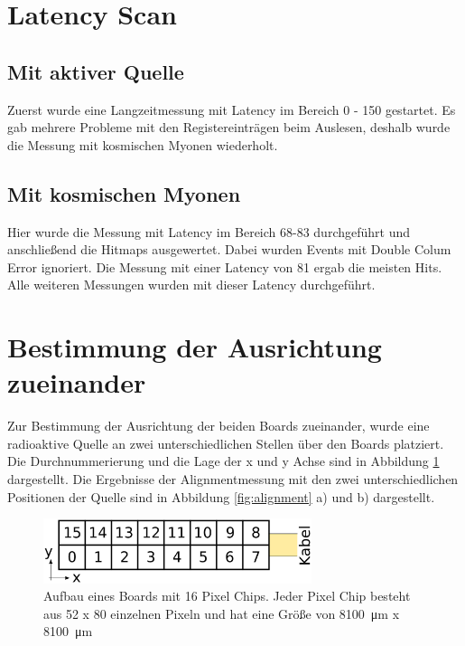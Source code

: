 \documentclass[usenames,dvipsnames]{include/protokollclass}
\begin{document}
	\section{Latency Scan}
	\subsection{Mit aktiver Quelle}
	Zuerst wurde eine Langzeitmessung mit Latency im Bereich 0 - 150 gestartet. 
	Es gab mehrere Probleme mit den Registereinträgen beim Auslesen, deshalb wurde die Messung mit kosmischen Myonen wiederholt. 
	\subsection{Mit kosmischen Myonen}
	Hier wurde die Messung mit Latency im Bereich 68-83 durchgeführt und anschließend die Hitmaps ausgewertet. Dabei wurden Events mit Double Colum Error ignoriert. Die Messung mit einer Latency von 81 ergab die meisten Hits. Alle weiteren Messungen wurden mit dieser Latency durchgeführt.
	
	\section{Bestimmung der Ausrichtung zueinander}
	Zur Bestimmung der Ausrichtung der beiden Boards zueinander, wurde eine radioaktive Quelle an zwei unterschiedlichen Stellen über den Boards platziert. Die Durchnummerierung und die Lage der x und y Achse sind in Abbildung \ref{fig:board} dargestellt. Die Ergebnisse der Alignmentmessung mit den zwei unterschiedlichen Positionen der Quelle sind in Abbildung \ref{fig:alignment} a) und b) dargestellt.
	\begin{figure}
		\centering
		\includegraphics[width=0.7\textwidth]{fig/board.eps}
		\caption{Aufbau eines Boards mit 16 Pixel Chips. Jeder Pixel Chip besteht aus 52 x 80 einzelnen Pixeln und hat eine Größe von \SI{8100}{\micro\meter} x \SI{8100}{\micro\meter}}
		\label{fig:board}
	\end{figure}
	
\end{document}
